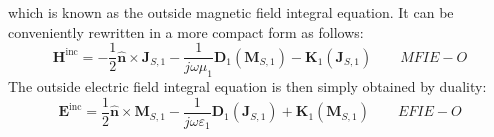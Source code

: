 \documentclass[a4paper,10pt]{book}
\newcommand{\field}[1]{\mathbf{#1}}
\newcommand{\current}[1]{\mathbf{#1}}
\newcommand{\vect}[1]{\mathbf{#1}}
\newcommand{\operator}[1]{\mathbf{#1}}
\begin{document}
which is known as the outside magnetic field integral equation. It can be conveniently rewritten in a more compact form as follows:
\begin{equation}\label{eqn:MFIE-O}
\boxed{
\field{H}^\text{inc} = - \frac{1}{2} \vect{\hat{n}} \times \current{J}_{S,1} - \frac{1}{j \omega \mu_1} \operator{D}_1 \left( \current{M}_{S,1}\right) - \operator{K}_1 \left(\current{J}_{S,1}\right)
} \qquad MFIE-O
\end{equation}
The outside electric field integral equation is then simply obtained by duality:
\begin{equation}\label{eqn:EFIE-O}
\boxed{
\field{E}^\text{inc} =  \frac{1}{2} \vect{\hat{n}} \times \current{M}_{S,1} - \frac{1}{j \omega \varepsilon_1} \operator{D}_1 \left( \current{J}_{S,1}\right) + \operator{K}_1 \left(\current{M}_{S,1}\right)
} \qquad EFIE-O
\end{equation}
\end{document}

